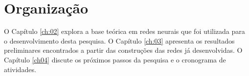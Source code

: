 \section{Organização}
\label{sec:organization}

O Capítulo \ref{ch:02} explora a base teórica em redes neurais que foi utilizada para o desenvolvimento desta pesquisa. O Capítulo \ref{ch:03} apresenta os resultados preliminares encontrados a partir das construções das redes já desenvolvidas. O Capítulo \ref{ch04} discute os próximos passos da pesquisa e o cronograma de atividades. %
